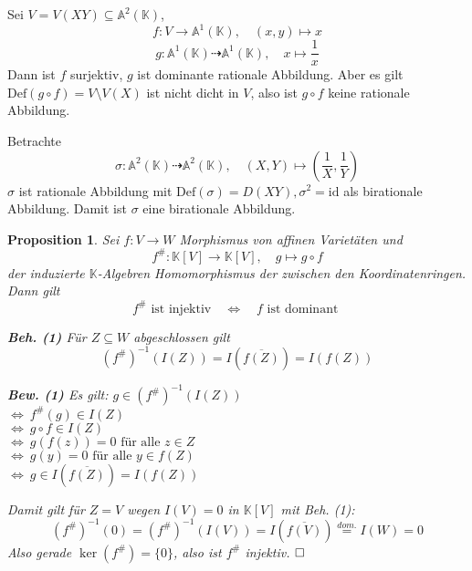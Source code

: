 \documentclass[11pt]{book}
\newtheorem{prop}[theorem]{Proposition}
\theoremstyle{nonumberbreak}
\newenvironment{pr}[1][]{\ifthenelse{\equal{#1}{}}{\proof}{\proof[#1]}\rm}{\endproof}
\newenvironment{ex}[1][]{\ifthenelse{\equal{#1}{}}{\example}{\example[#1]}\rm}{\endexample}
\begin{document}
\begin{spacing}{1.3}
\begin{ex} %

\begin{compactenum}
\item Sei $V=V(XY) \subseteq \mathbb{A}^2(\mathbb{K})$,
$$f: V \longrightarrow \mathbb{A}^1(\mathbb{K}), \quad (x,y) \mapsto x$$
$$g: \mathbb{A}^1(\mathbb{K}) \dashrightarrow \mathbb{A}^1(\mathbb{K}), \quad x \mapsto \frac{1}{x}$$
Dann ist $f$ surjektiv, $g$ ist dominante rationale Abbildung. Aber es gilt $\textrm{Def}(g \circ f)=V \setminus V(X)$ ist nicht dicht in $V$, also ist $g \circ f$ keine rationale Abbildung.
\item Betrachte 
$$ \sigma: \mathbb{A}^2(\mathbb{K}) \dashrightarrow \mathbb{A}^2(\mathbb{K}), \quad (X,Y) \mapsto \left(\frac{1}{X}, \frac{1}{Y}\right)$$
$\sigma$ ist rationale Abbildung mit $\textrm{Def}(\sigma)= D(XY), \sigma^2=\textrm{id}$ als birationale Abbildung. Damit ist $\sigma$ eine birationale Abbildung.  
\end{compactenum}
\end{ex}

\begin{prop} %

Sei $f: V \longrightarrow W$ Morphismus von affinen Varietäten und $$f^\#: \mathbb{K}[V] \longrightarrow \mathbb{K}[V], \quad g \mapsto g \circ f$$
der induzierte $\mathbb{K}$-Algebren Homomorphismus der zwischen den Koordinatenringen. Dann gilt
$$f^\# \textrm{ ist injektiv} \quad \Longleftrightarrow \quad f \textrm{ ist dominant }$$
\begin{pr}
\begin{compactenum}
\item[\textbf{Beh. (1)}] Für $Z \subseteq W$ abgeschlossen gilt
$$(f^\#)^{-1} (I(Z)) = I(\overline{f(Z)}) = I(f(Z))$$
\item[\textbf{Bew. (1)}] Es gilt: $g \in (f^\#)^{-1}(I(Z))$ \\
$\Longleftrightarrow \ f^\#(g) \in I(Z)$\\
$\Longleftrightarrow \ g \circ f \in I(Z) $\\
$\Longleftrightarrow \ g(f(z)) = 0 \textrm{ für alle } z \in Z$ \\
$\Longleftrightarrow \ g(y) = 0 \textrm{ für alle } y \in f(Z) $\\
$\Longleftrightarrow \ g \in I(\overline{f(Z)}) = I(f(Z))$
\end{compactenum}
Damit gilt für $Z=V$ wegen $I(V)=0$ in $\mathbb{K}[V]$ mit Beh. (1):
$$ (f^\#)^{-1}(0)= (f^\#)^{-1}(I(V)) = I(\overline{f(V)}) \overset{dom.}{=} I(W) = 0$$
Also gerade $\ker(f^\#)=\{0\}$, also ist $f^\#$ injektiv. $\hfill \Box$
\end{pr}
\end{prop}


\end{spacing}
\end{document}
